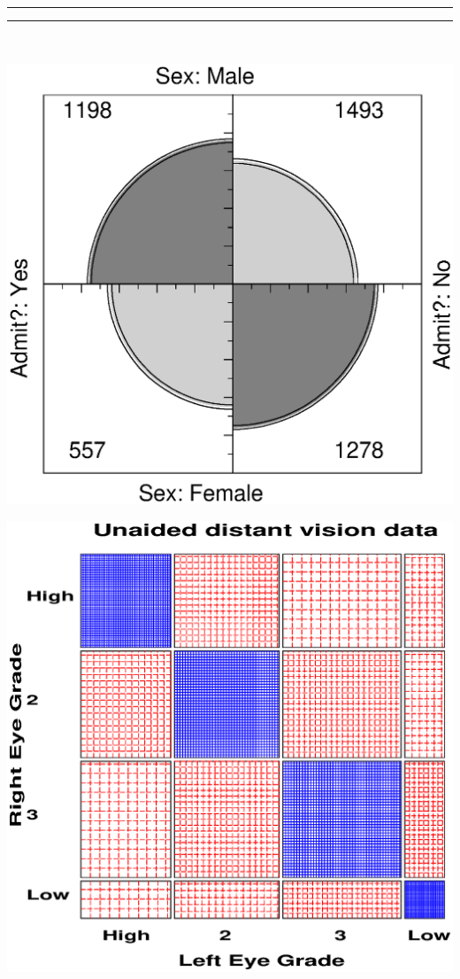 \begin{center}
 \rule[-4pt]{0.5pt}{4pt}\hrulefill\rule[-4pt]{0.5pt}{4pt}\\
 \begin{minipage}[c]{.33\linewidth}
  \includegraphics[width=1\linewidth,clip]{ch3/fig/fourfold13}
 \end{minipage}%
 \hfill
 \begin{minipage}[c]{.33\linewidth}
  \includegraphics[width=1\linewidth,clip]{ch3/fig/sieve2}

\end{minipage}
\end{center}
